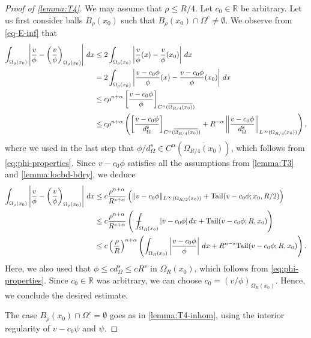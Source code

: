 \documentclass[11pt,reqno]{amsart}
\theoremstyle{plain}
\theoremstyle{definition}
\numberwithin{equation}{section}
\newcommand{\R}{\mathbb{R}}
\newcommand{\1}{\mathbbm{1}}
\renewcommand{\d}{\textnormal{\,d}}
\newcommand{\average}{{\mathchoice {\kern1ex\vcenter{\hrule height.4pt
width 6pt depth0pt} \kern-9.7pt} {\kern1ex\vcenter{\hrule
height.4pt width 4.3pt depth0pt} \kern-7pt} {} {} }}
\newcommand{\dashint}{\average\int}
\begin{document}
\begin{proof}[Proof of \autoref{lemma:T4}]
We may assume that $\rho \leq R/4$. Let $c_0 \in \R$ be arbitrary. Let us first consider balls $B_{\rho}(x_0)$ such that $B_{\rho}(x_0) \cap \Omega^c \not=\emptyset$. We observe from \eqref{eq-E-inf} that
\begin{align*}
\int_{\Omega_{\rho}(x_0)} \left|\frac{v}{\phi} - \left( \frac{v}{\phi} \right)_{\Omega_{\rho}(x_0)} \right| \d x &\le 2 \int_{\Omega_{\rho}(x_0)} \left|\frac{v}{\phi}(x) - \frac{v}{\phi}(x_0) \right| \d x \\
& = 2 \int_{\Omega_{\rho}(x_0)} \left|\frac{v - c_0 \phi}{\phi}(x) - \frac{v - c_0 \phi}{\phi}(x_0) \right| \d x \\
&\le c \rho^{n+\alpha} \left[ \frac{v - c_0 \phi}{\phi} \right]_{C^{\alpha}(\overline{\Omega_{R/4}(x_0)})} \\
&\le c \rho^{n+\alpha} \left( \left[ \frac{v-c_0 \phi}{d^s_{\Omega}} \right]_{C^{\alpha}(\overline{\Omega_{R/4}(x_0)})} + R^{-\alpha} \left\| \frac{v-c_0\phi}{d_\Omega^s} \right\|_{L^\infty(\Omega_{R/4}(x_0))} \right),
\end{align*}
where we used in the last step that $\phi/d_{\Omega}^s \in C^{\alpha}(\overline{\Omega_{R/4}(x_0)})$, which follows from \eqref{eq:phi-properties}.
Since $v - c_0 \phi$ satisfies all the assumptions from \autoref{lemma:T3} and \autoref{lemma:locbd-bdry}, we deduce
\begin{align*}
\int_{\Omega_{\rho}(x_0)} \left|\frac{v}{\phi} - \left( \frac{v}{\phi} \right)_{\Omega_{\rho}(x_0)} \right| \d x
&\le c \frac{\rho^{n+\alpha}}{R^{s+\alpha}} \left( \|v-c_0\phi\|_{L^\infty(\Omega_{R/2}(x_0))} + \mathrm{Tail}(v-c_0\phi; x_0, R/2) \right) \\
&\le c \frac{\rho^{n+\alpha}}{R^{s+\alpha}} \left( \dashint_{\Omega_R(x_0)} |v-c_0\phi| \d x + \mathrm{Tail}(v-c_0\phi; R,  x_0) \right) \\
&\le c \left( \frac{\rho}{R} \right)^{n+\alpha} \left( \int_{\Omega_{R}(x_0)} \left| \frac{v-c_0 \phi}{\phi} \right| \d x + R^{n-s} \mathrm{Tail}(v-c_0\phi; R,x_0) \right).
\end{align*}
Here, we also used that $\phi \le cd^s_{\Omega} \le c R^s$ in $\Omega_R(x_0)$, which follows from \eqref{eq:phi-properties}. Since $c_0 \in \R$ was arbitrary, we can choose $c_0 = (v/\phi)_{\Omega_R(x_0)}$. 
Hence, we conclude the desired estimate.

The case $B_{\rho}(x_0) \cap \Omega^c = \emptyset$ goes as in \autoref{lemma:T4-inhom}, using the interior regularity of $v-c_0\psi$ and $\psi$.
\end{proof}
\end{document}

